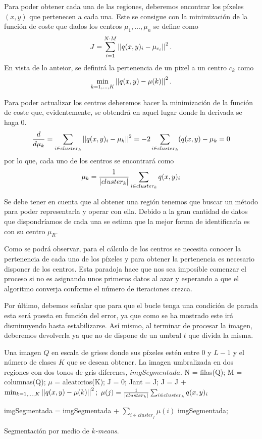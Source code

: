 Para poder obtener cada una de las regiones, deberemos encontrar los píxeles $(x,y)$ que pertenecen a cada una. Este se consigue con la minimización de la función de coste que dados los centros $\mu_1, \dots,\mu_n$ se define como
$$J=\sum_{i=1}^{N\cdot M}\left\vert\left\vert q(x,y)_i-\mu_{c_i}\right\vert\right\vert^2.$$
En vista de lo anteior, se definirá la pertenencia de un pixel a un centro $c_k$ como 
$$\min_{k=1,\dots,K} \left\vert\left\vert q(x,y)-\mu(k)\right\vert\right\vert^2.$$

Para poder actualizar los centros deberemos hacer la minimización de la función de coste que, evidentemente, se obtendrá en aquel lugar donde la derivada se haga 0. 
$$\frac{d}{d \mu_k} = \sum_{i\in cluster_k} \left\vert\left\vert q(x,y)_i-\mu_k\right\vert\right\vert^2 = -2\sum_{i\in cluster_k}(q(x,y)-\mu_k=0$$
por lo que, cada uno de los centros se encontrará como 
$$\mu_k = \frac{1}{\left\vert cluster_k\right\vert}\sum_{i\in cluster_k}q(x,y)_i$$

Se debe tener en cuenta que al obtener una región tenemos que buscar un método para poder representarla y operar con ella. Debido a la gran cantidad de datos que dispondríamos de cada una se estima que la mejor forma de identificarla es con su centro $\mu_R$. 

Como se podrá observar, para el cálculo de los centros se necesita conocer la pertenencia de cada uno de los píxeles y para obtener la pertenencia es necesario disponer de los centros. Esta paradoja hace que nos sea imposible comenzar el proceso si no es asignando unos primeros datos al azar y esperando a que el algoritmo converja conforme el número de iteraciones crezca.

Por último, debemos señalar que para que el bucle tenga una condición de parada esta será puesta en función del error, ya que como se ha mostrado este irá disminuyendo hasta estabilizarse. Así mismo, al terminar de procesar la imagen, deberemos devolverla ya que no de dispone de un umbral $t$ que divida la misma.

\begin{algorithm}
\begin{algorithmic}[1]
\REQUIRE Una imagen $Q$ en escala de grises donde sus píxeles estén entre $0$ y $L-1$ y el número de clases $K$ que se desean obtener.
\ENSURE La imagen umbralizada en dos regiones con dos tonos de gris diferenes, $imgSegmentada$.
\STATE N = filas(Q);
\STATE M = columnas(Q);
\STATE $\mu$ = aleatorios(K);
\STATE J = 0;
\REPEAT 
    \STATE Jant = J;
            \STATE J = J + $\min_{k=1,\dots,K} \left\vert\left\vert q(x,y)-\mu(k)\right\vert\right\vert^2;$
        \ENDFOR
    \ENDFOR
        \STATE $\mu(j) = \frac{1}{\left\vert cluster_k\right\vert}\sum_{i\in cluster_k}q(x,y)_i$
    \ENDFOR 
{}

    \STATE imgSegmentada = imgSegmentada + $\sum_{i\in cluster_j}\mu(i)$
\ENDFOR
\RETURN imgSegmentada;
\end{algorithmic}
\caption{Segmentación por medio de {\em $k$-means}.}\label{alg:kmeans}
\end{algorithm}


